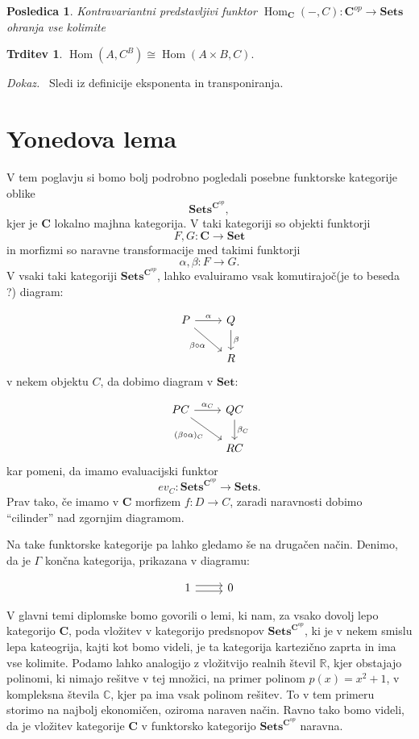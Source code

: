 \documentclass[12pt,a4paper]{book}
\theoremstyle{definition}
\theoremstyle{plain}
\newtheorem{trditev}[definicija]{Trditev}
\newtheorem{posledica}{Posledica}[definicija]
\newenvironment{dokaz}{\emph{Dokaz.}\ }{\hspace{\fill}{$\Box$}}
\theoremstyle{definition}
\theoremstyle{remark}
\newcommand{\cat}[1]{\textbf{#1}}
\DeclareMathOperator{\Hom}{Hom}
\newcommand{\predsnop}[1]{\cat{Sets}^{\cat{#1}^{op}}}
\begin{document}
\begin{posledica}
Kontravariantni predstavljivi funktor $\Hom_\cat{C}(-,C) : \cat{C}^{op} \to \cat{Sets}$ ohranja vse kolimite
\end{posledica}

\begin{trditev}
$\Hom(A, C^B) \cong \Hom(A \times B, C).$
\end{trditev}
\begin{dokaz}
Sledi iz definicije eksponenta in transponiranja.
\end{dokaz}


\chapter{Yonedova lema}

V tem poglavju si bomo bolj podrobno pogledali posebne funktorske kategorije oblike
$$\predsnop{C},$$
kjer je $\cat{C}$ lokalno majhna kategorija. V taki kategoriji so objekti funktorji 
$$F,G : \cat{C} \to \cat{Set}$$
in morfizmi so naravne transformacije med takimi funktorji
$$\alpha, \beta : F \to G.$$ 
V vsaki taki kategoriji $\predsnop{C}$, lahko evaluiramo vsak komutirajoč(je to beseda ?) diagram:

$$
\begin{tikzcd}
P \ar[r, "\alpha"] \ar[rd, "\beta \circ \alpha"'] & Q \ar[d, "\beta"] \\
& R
\end{tikzcd}
$$
v nekem objektu $C$, da dobimo diagram v $\cat{Set}$:

$$
\begin{tikzcd}
PC \ar[r, "\alpha_C"] \ar[rd, "(\beta \circ \alpha)_C"'] & QC \ar[d, "\beta_C"] \\
& RC
\end{tikzcd}
$$
kar pomeni, da imamo evaluacijski funktor
$$ev_C : \predsnop{C} \to \cat{Sets}.$$
Prav tako, če imamo v $\cat{C}$ morfizem $f : D \to C$, zaradi naravnosti dobimo "`cilinder"' nad zgornjim diagramom.


Na take funktorske kategorije pa lahko gledamo še na drugačen način. Denimo, da je $\Gamma$ končna kategorija, prikazana v diagramu:

$$
\begin{tikzcd}
1 \ar[r, shift left] \ar[r, shift right] & 0
\end{tikzcd}
$$

V glavni temi diplomske bomo govorili o lemi, ki nam, za vsako dovolj lepo kategorijo $\cat{C}$, poda vložitev v kategorijo predsnopov $\predsnop{C}$, ki je v nekem smislu lepa kateogrija, kajti kot bomo videli, je ta kategorija kartezično zaprta in ima vse kolimite.
Podamo lahko analogijo z vložitvijo realnih števil $\mathbb{R}$, kjer obstajajo polinomi, ki nimajo rešitve v tej množici, na primer polinom $p(x) = x^2 + 1$, v kompleksna števila $\mathbb{C}$, kjer pa ima vsak polinom rešitev. To v tem primeru storimo na najbolj ekonomičen, oziroma naraven način. Ravno tako bomo videli, da je vložitev kategorije $\cat{C}$ v funktorsko kategorijo $\predsnop{C}$ naravna.
\end{document}
